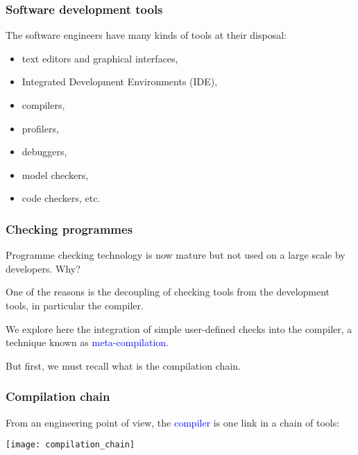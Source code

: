 \documentclass[compress,dvips,xcolor={dvipsnames},t]{beamer}
\begin{document}
% 
\begin{frame}
\frametitle{Software development tools}


The software engineers have many kinds of tools at their disposal:
\begin{itemize}

  \item text editors and graphical interfaces,

  \item Integrated Development Environments (IDE),

  \item compilers,

  \item profilers,

  \item debuggers,

  \item model checkers,

  \item code checkers, etc.

\end{itemize}

\end{frame}


% 
\begin{frame}
\frametitle{Checking programmes}


Programme checking technology is now mature but not used on a large
scale by developers. Why?

One of the reasons is the decoupling of checking tools from the
development tools, in particular the compiler.

We explore here the integration of simple user\hyp{}defined checks
into the compiler, a technique known as
\textcolor{blue}{meta\hyp{}compilation}.

But first, we must recall what is the compilation chain.

\end{frame}


% 
\begin{frame}
\frametitle{Compilation chain}


From an engineering point of view, the \textcolor{blue}{compiler} is
one link in a chain of tools:
\begin{center}
\texttt{[image: compilation\_chain]}
\end{center}

\end{frame}
\end{document}
